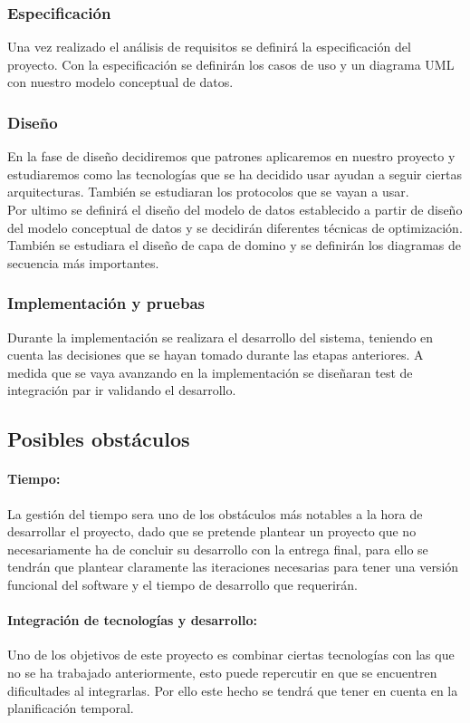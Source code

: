 \subsubsection{Especificación}
Una vez realizado el análisis de requisitos se definirá la especificación del proyecto. Con la especificación se definirán los casos de uso y un diagrama UML con nuestro modelo conceptual de datos.

\subsubsection{Diseño}
En la fase de diseño decidiremos que patrones aplicaremos en nuestro proyecto y estudiaremos como las tecnologías que se ha decidido usar ayudan a seguir ciertas arquitecturas. También se estudiaran los protocolos que se vayan a usar.\\
Por ultimo se definirá el diseño del modelo de datos establecido a partir de diseño del modelo conceptual de datos y se decidirán diferentes técnicas de optimización. También se estudiara el diseño de capa de domino y se definirán los diagramas de secuencia más importantes.

\subsubsection{Implementación y pruebas}
Durante la implementación se realizara el desarrollo del sistema,  teniendo en cuenta las decisiones que se hayan tomado durante las etapas anteriores. A medida que se vaya avanzando en la implementación se diseñaran test de integración par ir validando el desarrollo.

\subsection{Posibles obstáculos}

\paragraph{Tiempo:}
La gestión del tiempo sera uno de los obstáculos más notables a la hora de desarrollar el proyecto, dado que se pretende plantear un proyecto que no necesariamente ha de concluir su desarrollo con la entrega final, para ello se tendrán que plantear claramente las iteraciones necesarias para tener una versión funcional del software y el tiempo de desarrollo que requerirán.
\paragraph{Integración de tecnologías y desarrollo:}
Uno de los objetivos de este proyecto es combinar ciertas tecnologías con las que no se ha trabajado anteriormente, esto puede repercutir en que se encuentren dificultades al integrarlas. Por ello este hecho se tendrá que tener en cuenta en la planificación temporal.
